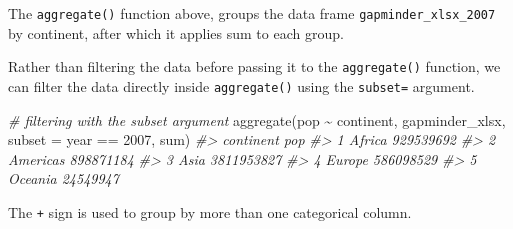 \documentclass[
]{book}
\newenvironment{Shaded}{\begin{snugshade}}{\end{snugshade}}
\newcommand{\AttributeTok}[1]{\textcolor[rgb]{0.77,0.63,0.00}{#1}}
\newcommand{\CommentTok}[1]{\textcolor[rgb]{0.56,0.35,0.01}{\textit{#1}}}
\newcommand{\DecValTok}[1]{\textcolor[rgb]{0.00,0.00,0.81}{#1}}
\newcommand{\FunctionTok}[1]{\textcolor[rgb]{0.00,0.00,0.00}{#1}}
\newcommand{\NormalTok}[1]{#1}
\newcommand{\SpecialCharTok}[1]{\textcolor[rgb]{0.00,0.00,0.00}{#1}}
\begin{document}
The \texttt{aggregate()} function above, groups the data frame \texttt{gapminder\_xlsx\_2007} by continent, after which it applies sum to each group.

Rather than filtering the data before passing it to the \texttt{aggregate()} function, we can filter the data directly inside \texttt{aggregate()} using the \texttt{subset=} argument.

\begin{Shaded}
\begin{Highlighting}[]
\CommentTok{\# filtering with the subset argument}
\FunctionTok{aggregate}\NormalTok{(pop }\SpecialCharTok{\textasciitilde{}}\NormalTok{ continent, gapminder\_xlsx, }
          \AttributeTok{subset =}\NormalTok{ year }\SpecialCharTok{==} \DecValTok{2007}\NormalTok{, }
\NormalTok{          sum)}
\CommentTok{\#\textgreater{}   continent        pop}
\CommentTok{\#\textgreater{} 1    Africa  929539692}
\CommentTok{\#\textgreater{} 2  Americas  898871184}
\CommentTok{\#\textgreater{} 3      Asia 3811953827}
\CommentTok{\#\textgreater{} 4    Europe  586098529}
\CommentTok{\#\textgreater{} 5   Oceania   24549947}
\end{Highlighting}
\end{Shaded}

The \texttt{+} sign is used to group by more than one categorical column.
\end{document}

